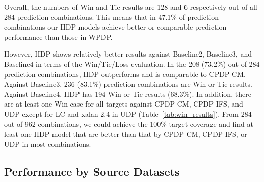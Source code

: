 


Overall, the numbers of Win and
Tie results are 128 and 6 respectively out of all 284 prediction
combinations.
This means that in 47.1\% of prediction combinations our HDP
models achieve better or comparable prediction performance than those in
WPDP.

However, HDP shows relatively better results against Baseline2, Baseline3, and Baseline4 in terms of the Win/Tie/Loss evaluation.
In the 208 (73.2\%) out of 284 prediction combinations, HDP outperforms and is comparable to CPDP-CM. Against Baseline3, 236
(83.1\%) prediction combinations are Win or Tie results. Against Baseline4, HDP has 194 Win or Tie results (68.3\%). In addition, there are at least one Win case for all targets against CPDP-CM, CPDP-IFS, and UDP except for LC and xalan-2.4 in UDP (Table~\ref{tab:win_results}).
From 284 out of 962 combinations, we could achieve the 100\% target coverage and find at least one HDP model that are better than that by CPDP-CM, CPDP-IFS, or UDP in most combinations.



\subsection{Performance by Source Datasets}
\label{subsec04-0}


